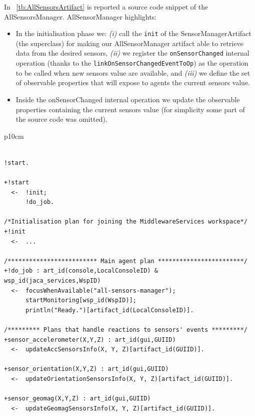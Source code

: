 \documentclass[11pt]{report}
\newcommand\labeltab[1]{\label{tb:#1}}
\newcommand\xt[1]{\tablename~\ref{tb:#1}}
\newcommand\code[1]{{\mbox{\texttt{{#1}}}}}
\newcommand{\jason}{\mbox{\sf{\emph{{Jason}}}}}
\begin{document}
In \xt{AllSensorsArtifact} is reported a source code snippet of the \mbox{\textsf{AllSensorsManager}}. \mbox{\textsf{AllSensorManager}} highlights:
%
\begin{itemize}
%
\item In the initialisation phase we: \textit{(i)} call the \code{init} of the \textsf{SensorManagerArtifact} (the superclass) for making our \textsf{AllSensorManager} artifact able to retrieve data from the desired sensors, \textit{(ii)} we register the \code{onSensorChanged} internal operation (thanks to the \code{linkOnSensorChangedEventToOp}) as the operation to be called when new sensors value are available, and \textit{(iii)} we define the set of observable properties that will expose to agents the current sensors value.
%
\item Inside the \textsf{onSensorChanged} internal operation we update the observable properties containing the current sensors value (for simplicity some part of the source code was omitted).
\end{itemize}



\begin{table}[!ht]
\begin{tabular} {p{10cm}}
\begin{minipage}{10cm}
{\scriptsize \begin{verbatim}

!start.

+!start
  <-  !init;
      !do_job.

/*Initialisation plan for joining the MiddlewareServices workspace*/
+!init 
  <-  ...
		
/************************* Main agent plan ************************/		
+!do_job : art_id(console,LocalConsoleID) & wsp_id(jaca_services,WspID)
  <-  focusWhenAvailable("all-sensors-manager");
      startMonitoring[wsp_id(WspID)];
      println("Ready.")[artifact_id(LocalConsoleID)].

/********* Plans that handle reactions to sensors' events *********/
+sensor_accelerometer(X,Y,Z) : art_id(gui,GUIID)
  <-  updateAccSensorsInfo(X, Y, Z)[artifact_id(GUIID)].

+sensor_orientation(X,Y,Z) : art_id(gui,GUIID)
  <-  updateOrientationSensorsInfo(X, Y, Z)[artifact_id(GUIID)].	

+sensor_geomag(X,Y,Z) : art_id(gui,GUIID)
  <-  updateGeomagSensorsInfo(X, Y, Z)[artifact_id(GUIID)].
\end{verbatim}}
\end{minipage}
\end{tabular}
\caption{Source code snippet of the \jason{} agent used in this test.}
    \labeltab{test1agent}
\end{table}
\end{document}
